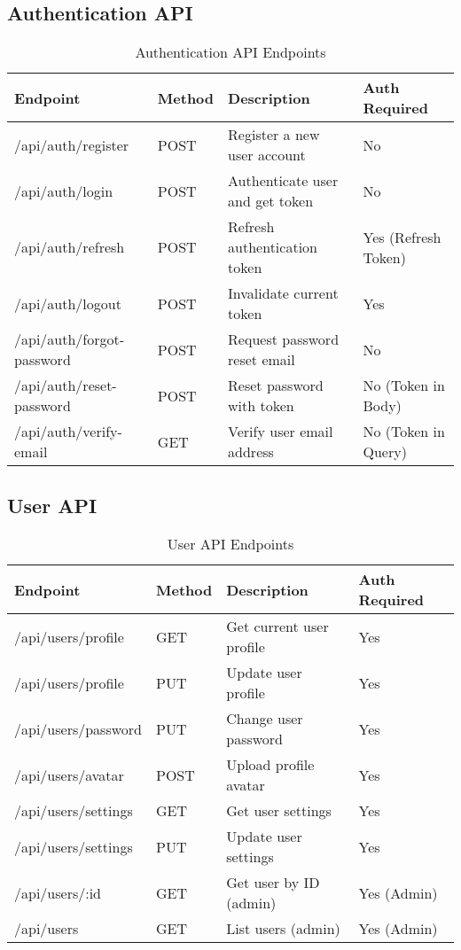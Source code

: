 \documentclass[12pt,a4paper]{article}
\begin{document}
\subsection{Authentication API}
\begin{table}[H]
\centering
\begin{tabular}{|p{3cm}|p{2cm}|p{5cm}|p{4cm}|}
\hline
\textbf{Endpoint} & \textbf{Method} & \textbf{Description} & \textbf{Auth Required} \\
\hline
/api/auth/register & POST & Register a new user account & No \\
\hline
/api/auth/login & POST & Authenticate user and get token & No \\
\hline
/api/auth/refresh & POST & Refresh authentication token & Yes (Refresh Token) \\
\hline
/api/auth/logout & POST & Invalidate current token & Yes \\
\hline
/api/auth/forgot-password & POST & Request password reset email & No \\
\hline
/api/auth/reset-password & POST & Reset password with token & No (Token in Body) \\
\hline
/api/auth/verify-email & GET & Verify user email address & No (Token in Query) \\
\hline
\end{tabular}
\caption{Authentication API Endpoints}
\end{table}

\subsection{User API}
\begin{table}[H]
\centering
\begin{tabular}{|p{3cm}|p{2cm}|p{5cm}|p{4cm}|}
\hline
\textbf{Endpoint} & \textbf{Method} & \textbf{Description} & \textbf{Auth Required} \\
\hline
/api/users/profile & GET & Get current user profile & Yes \\
\hline
/api/users/profile & PUT & Update user profile & Yes \\
\hline
/api/users/password & PUT & Change user password & Yes \\
\hline
/api/users/avatar & POST & Upload profile avatar & Yes \\
\hline
/api/users/settings & GET & Get user settings & Yes \\
\hline
/api/users/settings & PUT & Update user settings & Yes \\
\hline
/api/users/:id & GET & Get user by ID (admin) & Yes (Admin) \\
\hline
/api/users & GET & List users (admin) & Yes (Admin) \\
\hline
\end{tabular}
\caption{User API Endpoints}
\end{table}
\end{document}
